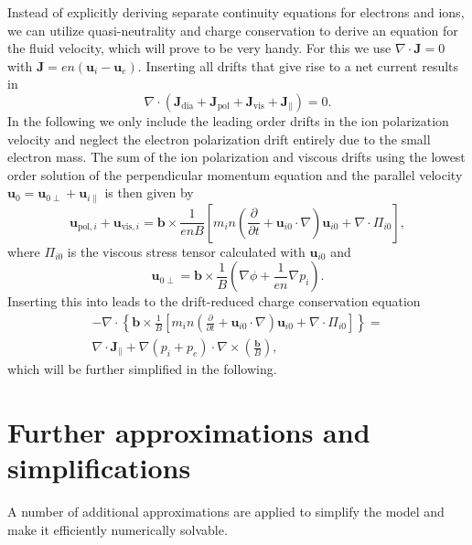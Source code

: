 Instead of explicitly deriving separate continuity equations for electrons and ions, we can utilize quasi-neutrality and charge conservation to derive an equation for the fluid velocity, which will prove to be very handy. For this we use $\nabla \cdot \textbf{J} = 0$ with $\textbf{J}= e n (\textbf{u}_i - \textbf{u}_e)$. Inserting all drifts that give rise to a net current results in 
\begin{equation}\label{diff_J}
	\nabla \cdot \left(\textbf{J}_{\mathrm{dia}} + \textbf{J}_{\mathrm{pol}} +\textbf{J}_{\mathrm{vis}}+ \textbf{J}_{\parallel}\right) = 0.
\end{equation}
In the following we only include the leading order drifts in the ion polarization velocity and neglect the electron polarization drift entirely due to the small electron mass. The sum of the ion polarization and viscous drifts using the lowest order solution
of the perpendicular momentum equation and the parallel velocity $\textbf{u}_0 = \textbf{u}_{0\perp} + \textbf{u}_{i\parallel}$ is then given by
\begin{equation}
	\textbf{u}_{\mathrm{pol},i} + \textbf{u}_{\mathrm{vis},i} = \textbf{b}\times \frac{1}{enB}\left[m_i n \left(\frac{\partial}{\partial t} + \textbf{u}_{i0} \cdot \nabla\right)\textbf{u}_{i0} + \nabla \cdot \Pi_{i0}\right],
\end{equation}
where $\Pi_{i0}$ is the viscous stress tensor calculated with $\textbf{u}_{i0}$ and
\begin{equation}
	\textbf{u}_{0\perp} = \textbf{b}\times \frac{1}{B}\left(\nabla \phi + \frac{1}{en} \nabla p_i \right).
\end{equation}
Inserting this into  leads to the drift-reduced charge conservation equation  \cite{militellobook}
\begin{multline}\label{charge_conservation}
	-\nabla \cdot \left\{\textbf{b}\times\frac{1}{B} \left[m_i n\left(\frac{\partial}{\partial t} + \textbf{u}_{i0}\cdot \nabla\right)\textbf{u}_{i0} + \nabla\cdot \Pi_{i0}\right]\right\} =\\ \nabla\cdot\textbf{J}_\parallel + \nabla \left(p_i + p_e\right) \cdot \nabla\times \left(\frac{\textbf{b}}{B}\right),
\end{multline}
which will be further simplified in the following.
\section{Further approximations and simplifications}
A number of additional approximations are applied to simplify the model and make it efficiently numerically solvable. 

